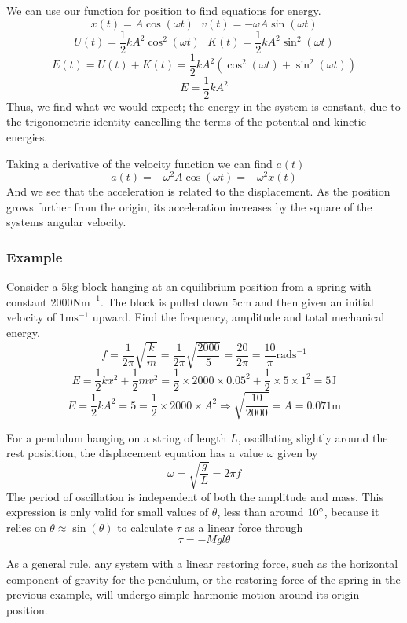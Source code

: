 \documentclass[12pt]{report}
\begin{document}
\begin{flushleft}
\bigskip
We can use our function for position to find equations for energy.
\[x(t) = A\cos(\omega t) \:\:\: v(t) = -\omega A\sin(\omega t)\]
\[U(t) = \frac{1}{2}kA^2\cos^2(\omega t) \:\:\: 
K(t) = \frac{1}{2}kA^2\sin^2(\omega t)\]
\[E(t) = U(t)+ K(t) = \frac{1}{2}kA^2(\cos^2(\omega t) + \sin^2(\omega t))\]
\[E = \frac{1}{2}kA^2\]
Thus, we find what we would expect; the energy in the system is constant, due 
to the trigonometric identity cancelling the terms of the potential and kinetic
energies.

\bigskip
Taking a derivative of the velocity function we can find \(a(t)\)
\[a(t) = -\omega^2A\cos(\omega t) = -\omega^2x(t)\]
And we see that the acceleration is related to the displacement. As the 
position grows further from the origin, its acceleration increases by the 
square of the systems angular velocity.

\subsubsection*{Example}
Consider a \(5\mathrm{kg}\) block hanging at an equilibrium position from a 
spring with constant \(2000\mathrm{Nm}^{-1}\). The block is pulled down 
\(5\mathrm{cm}\) and then given an initial velocity of \(1\mathrm{ms}^{-1}\)
upward. Find the frequency, amplitude and total mechanical energy.
\[f = \frac{1}{2\pi}\sqrt{\frac{k}{m}} = \frac{1}{2\pi}\sqrt{\frac{2000}{5}}
= \frac{20}{2\pi} = \frac{10}{\pi}\mathrm{rads}^{-1}\]
\[E = \frac{1}{2}kx^2 + \frac{1}{2}mv^2 = \frac{1}{2}\times2000\times0.05^2 +
\frac{1}{2}\times5\times1^2 = 5\mathrm{J}\]
\[E = \frac{1}{2}kA^2 = 5 = \frac{1}{2}\times2000\times A^2 \Rightarrow
\sqrt{\frac{10}{2000}} = A = 0.071\mathrm{m}\]

\bigskip
For a pendulum hanging on a string of length \(L\), oscillating slightly
around the rest posisition, the displacement equation has a value \(\omega\)
given by
\[\omega = \sqrt{\frac{g}{L}} = 2\pi f\]
The period of oscillation is independent of both the amplitude and mass.
This expression is only valid for small values of \(\theta\), less than
around \(10\degree\), because it relies on \(\theta\approx\sin(\theta)\) to
calculate \(\tau\) as a linear force through
\[\tau = -Mgl\theta\]

As a general rule, any system with a linear restoring force, such as the 
horizontal component of gravity for the pendulum, or the restoring force of the
spring in the previous example, will undergo simple harmonic motion around its
origin position.


\end{flushleft}
\end{document}
